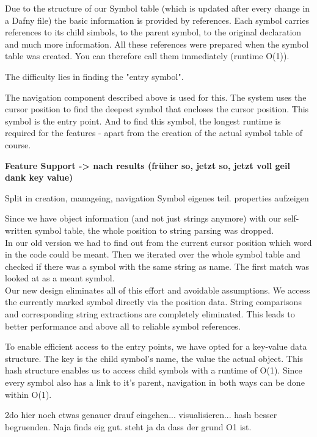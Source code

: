 Due to the structure of our Symbol table (which is updated after every change in a Dafny file)
the basic information is provided by references.
Each symbol carries references to its child simbols, to the parent symbol, to the original declaration and much more information.
All these references were prepared when the symbol table was created. You can therefore call them immediately (runtime O(1)).  

The difficulty lies in finding the "entry symbol".

The navigation component described above is used for this. The system uses the cursor position to find the deepest symbol that encloses the cursor position. This symbol is the entry point. And to find this symbol, the longest runtime is required for the features - apart from the creation of the actual symbol table of course.

\textbf{Feature Support -> nach results (früher so, jetzt so, jetzt voll geil dank key value)}

Split in creation, manageing, navigation
Symbol eigenes teil.
properties aufzeigen


Since we have object information (and not just strings anymore) with our self-written symbol table,
the whole position to string parsing was dropped. \\

In our old version we had to find out from the current cursor position which word in the code could be meant.
Then we iterated over the whole symbol table and checked if there was a symbol with the same string as name.
The first match was looked at as a meant symbol. \\

Our new design eliminates all of this effort and avoidable assumptions.
We access the currently marked symbol directly via the position data.
String comparisons and corresponding string extractions are completely eliminated.
This leads to better performance and above all to reliable symbol references.

To enable efficient access to the entry points, we have opted for a key-value data structure. The key is the child symbol's name, the value the actual  object.
This hash structure enables us to access child symbols with a runtime of O(1). Since every symbol also has a link to it's parent, navigation in both ways can be done within O(1).

2do hier noch etwas genauer drauf eingehen... visualisieren... hash besser begruenden. Naja finds eig gut. steht ja da dass der grund O1 ist.





